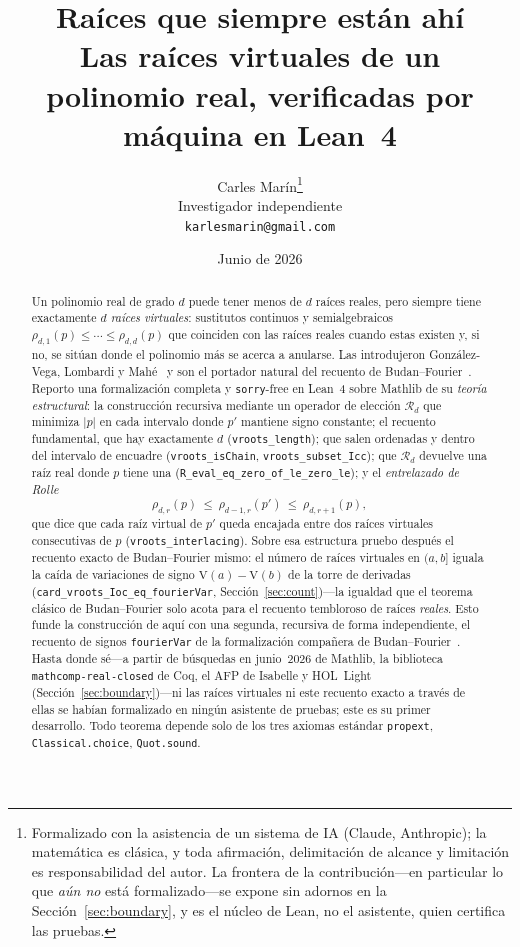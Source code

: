 \documentclass[11pt]{article}
\title{\bf Ra\'ices que siempre est\'an ah\'i\\[4pt]
  \large\normalfont Las ra\'ices virtuales de un polinomio real, verificadas por m\'aquina en Lean~4}
\author{Carles Mar\'in\thanks{Formalizado con la asistencia de un sistema de IA (Claude, Anthropic);
la matem\'atica es cl\'asica, y toda afirmaci\'on, delimitaci\'on de alcance y limitaci\'on es
responsabilidad del autor. La frontera de la contribuci\'on---en particular lo que \emph{a\'un no}
est\'a formalizado---se expone sin adornos en la Secci\'on~\ref{sec:boundary}, y es el n\'ucleo de
Lean, no el asistente, quien certifica las pruebas.}\\[3pt]
  \normalsize Investigador independiente\\
  \normalsize \texttt{karlesmarin@gmail.com}}
\date{Junio de 2026}
\newcommand{\lean}[1]{\texttt{#1}}
\newcommand{\V}{\mathrm{V}}
\newcommand{\Rd}{\mathcal{R}}
\begin{document}
\maketitle

\begin{abstract}
Un polinomio real de grado $d$ puede tener menos de $d$ ra\'ices reales, pero siempre tiene
exactamente $d$ \emph{ra\'ices virtuales}: sustitutos continuos y semialgebraicos
$\rho_{d,1}(p)\le\cdots\le\rho_{d,d}(p)$ que coinciden con las ra\'ices reales cuando estas existen y,
si no, se sit\'uan donde el polinomio m\'as se acerca a anularse. Las introdujeron Gonz\'alez-Vega,
Lombardi y Mah\'e~\cite{glm} y son el portador natural del recuento de Budan--Fourier~\cite{coste}.
Reporto una formalizaci\'on completa y \lean{sorry}-free en Lean~4 sobre Mathlib de su \emph{teor\'ia
estructural}: la construcci\'on recursiva mediante un operador de elecci\'on $\Rd_d$ que minimiza
$|p|$ en cada intervalo donde $p'$ mantiene signo constante; el recuento fundamental, que hay
exactamente $d$ (\lean{vroots\_length}); que salen ordenadas y dentro del intervalo de encuadre
(\lean{vroots\_isChain}, \lean{vroots\_subset\_Icc}); que $\Rd_d$ devuelve una ra\'iz real donde $p$
tiene una (\lean{R\_eval\_eq\_zero\_of\_le\_zero\_le}); y el \emph{entrelazado de Rolle}
\[
  \rho_{d,r}(p)\ \le\ \rho_{d-1,r}(p')\ \le\ \rho_{d,r+1}(p),
\]
que dice que cada ra\'iz virtual de $p'$ queda encajada entre dos ra\'ices virtuales consecutivas de
$p$ (\lean{vroots\_interlacing}). Sobre esa estructura pruebo despu\'es el recuento exacto de
Budan--Fourier mismo: el n\'umero de ra\'ices virtuales en $(a,b]$ iguala la ca\'ida de variaciones de
signo $\V(a)-\V(b)$ de la torre de derivadas (\lean{card\_vroots\_Ioc\_eq\_fourierVar},
Secci\'on~\ref{sec:count})---la igualdad que el teorema cl\'asico de Budan--Fourier solo acota para el
recuento tembloroso de ra\'ices \emph{reales}. Esto funde la construcci\'on de aqu\'i con una segunda,
recursiva de forma independiente, el recuento de signos \lean{fourierVar} de la formalizaci\'on
compa\~nera de Budan--Fourier~\cite{bflean}. Hasta donde s\'e---a partir de b\'usquedas en junio~2026
de Mathlib, la biblioteca \lean{mathcomp-real-closed} de Coq, el AFP de Isabelle y HOL~Light
(Secci\'on~\ref{sec:boundary})---ni las ra\'ices virtuales ni este recuento exacto a trav\'es de ellas
se hab\'ian formalizado en ning\'un asistente de pruebas; este es su primer desarrollo. Todo teorema
depende solo de los tres axiomas est\'andar \lean{propext}, \lean{Classical.choice}, \lean{Quot.sound}.
\end{abstract}
\end{document}
